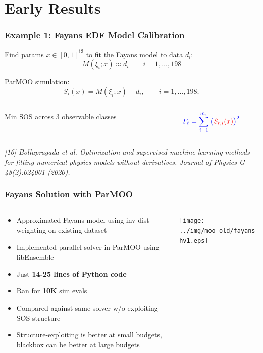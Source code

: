 \documentclass[aspectratio=169]{beamer}
\begin{document}
\section{Early Results}

\begin{frame}\frametitle{Example 1: Fayans EDF Model Calibration}
Find params $x \in [0, 1]^{13}$ to fit the Fayans model to data $d_i$:
$$
M\left(\xi_{i};x\right) \approx d_{i} \qquad i=1,\ldots, 198
$$

\medskip

ParMOO simulation:
$$
S_{i}(x) = M\left(\xi_{i};x\right) - d_{i},
\qquad i=1,\ldots, 198;
$$

\medskip

\begin{columns}
\begin{column}{0.65\textwidth}
Min SOS across 3 observable classes
\end{column}
\begin{column}{0.35\textwidth}
$$
{\color{blue}F_t = \sum_{i=1}^{m_t}\big({\color{red}S_{t,i}(x)}\big)^2}
$$
\end{column}
\end{columns}

\vfill

{\tiny\it
[16] Bollapragada et al.
Optimization and supervised machine learning methods for fitting numerical physics models without derivatives.
Journal of Physics G 48(2):024001 (2020).\\}
\end{frame}

\begin{frame}\frametitle{Fayans Solution with ParMOO}
\begin{columns}
\begin{column}{0.5\textwidth}
\begin{itemize}
\item Approximated Fayans model using inv dist weighting on existing dataset
\item {\color{blue}
Implemented parallel solver in ParMOO} using libEnsemble
\item Just {\bf 14-25 lines of Python code}
\item Ran for {\bf 10K} sim evals
\item Compared against
{\color{red} same solver w/o exploiting SOS structure}
\item Structure-exploiting is better at small budgets, blackbox can be better at large budgets
\end{itemize}
\end{column}
\begin{column}{0.5\textwidth}
\texttt{[image: ../img/moo\_old/fayans\_hv1.eps]}
\end{column}
\end{columns}
\end{frame}
\end{document}
